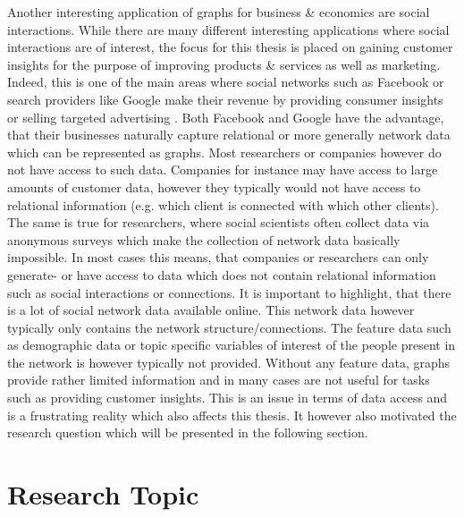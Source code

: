 	\noindent Another interesting application of graphs for business \& 
	economics are social interactions. While there are many different
	interesting applications where social interactions are of interest,
	the focus for this thesis is placed on gaining customer insights for the 
	purpose of improving products \& services as well as marketing. Indeed, 
	this is one of the main areas where social networks such as Facebook or 
	search providers like Google make their revenue by providing consumer
	insights or selling targeted advertising \citep{Facebook2021,Alphabet2021}. 
	Both Facebook and Google have the advantage, that their businesses 
	naturally capture relational or more generally network data which can be 
	represented as graphs. Most researchers or companies however do not have 
	access to such data. Companies for instance may have access to large 
	amounts of customer data, however they typically would not have access to 
	relational information (e.g. which client is connected with which other 
	clients). The same is true for researchers, where social scientists often 
	collect data via anonymous surveys which make the collection of network
	data basically impossible. In most cases this means, that companies or
	researchers can only generate- or have access to data which does not
	contain relational information such as social interactions or connections. 
	It is important to highlight, that there is a lot of social network data 
	available online. This network data however typically only contains the 
	network structure/connections. The feature data such as demographic data or
	topic specific variables of interest of the people present in the network 
	is however typically not provided. Without any feature data, graphs provide 
	rather limited information and in many cases are not useful for tasks such
	as providing customer insights. This is an issue in terms of data access 
	and is a frustrating reality which also affects this thesis. It however also
	motivated the research question which will be presented in the following 
	section.
	
	\section{Research Topic}

